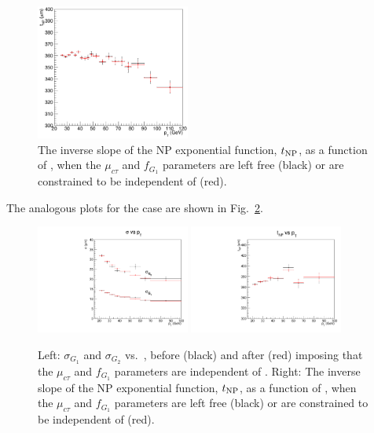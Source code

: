 \begin{figure}[h]
\centering
\includegraphics[width=0.45\textwidth]{Figures/chapter4/parB_lambda.pdf}
\caption{The inverse slope of the NP exponential function, $t_{\rm NP}$,
as a function of \pt, 
when the $\mu_{c\tau}$ and $f_{G_1}$ parameters are left free (black)
or are constrained to be independent of \pt (red).}
\label{fig:lt_slope}
\end{figure}

The analogous plots for the \psip case are shown in Fig.~\ref{fig:lt-psip}.

\begin{figure}[h]
\centering
\includegraphics[width=0.45\textwidth]{Figures/chapter4/parB_sig1-psip.pdf}
\includegraphics[width=0.45\textwidth]{Figures/chapter4/parB_lambda-psip.pdf}
\caption{Left: \psip $\sigma_{G_1}$ and $\sigma_{G_2}$ vs.\ \pt, 
before (black) and after (red) imposing that 
the $\mu_{c\tau}$ and $f_{G_1}$ parameters are independent of \pt.
Right: The inverse slope of the \psip NP exponential function, 
$t_{\rm NP}$, as a function of \pt, 
when the $\mu_{c\tau}$ and $f_{G_1}$ parameters are left free (black)
or are constrained to be independent of \pt (red).}
\label{fig:lt-psip}
\end{figure}


